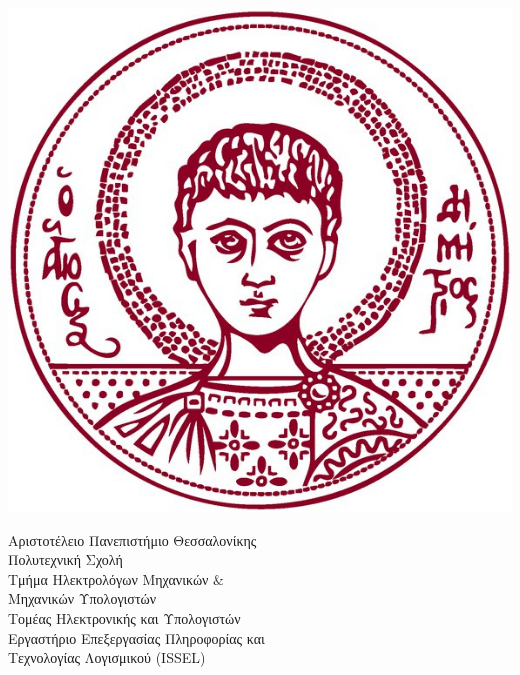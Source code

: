 \begin{titlepage}

  \begin{minipage}{0.3\textwidth}
    \begin{flushleft}
      \includegraphics[scale=0.25]{./images/title/authLogoTr.jpg}
    \end{flushleft}
  \end{minipage}
  \begin{minipage}{0.9\textwidth}
    \begin{flushleft}
      \large Αριστοτέλειο Πανεπιστήμιο Θεσσαλονίκης \\
      Πολυτεχνική Σχολή \\
      Τμήμα Ηλεκτρολόγων Μηχανικών $\&$ \\ Μηχανικών Υπολογιστών\\
      \vspace{1mm}
      \normalsize{Τομέας Ηλεκτρονικής και Υπολογιστών} \\
      \vspace{1mm}
      \normalsize{Εργαστήριο Επεξεργασίας Πληροφορίας και \\Τεχνολογίας Λογισμικού (ISSEL)} \\[5cm] 
    \end{flushleft}
  \end{minipage} \\[1.7cm]





\end{titlepage}
